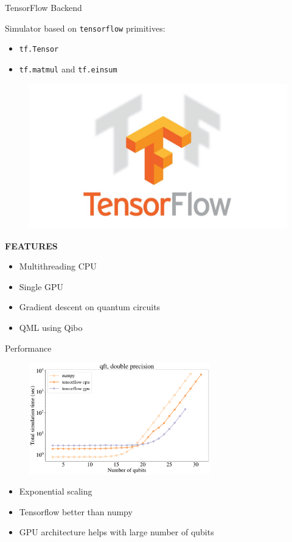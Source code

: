\documentclass[11p,aspectratio=169]{beamer}
\begin{document}
\begin{frame}{TensorFlow Backend}

    \begin{multicols*}{2}
        Simulator based on \texttt{tensorflow} primitives:
    \begin{itemize}
        \item \texttt{tf.Tensor}
        \item  \texttt{tf.matmul} and \texttt{tf.einsum}
    \end{itemize}
    \begin{figure}
        \includegraphics[width=0.3 \textwidth]{figures/tensorflow.jpg}
    \end{figure}
    \end{multicols*}
    

    \textbf{FEATURES}
    \begin{multicols*}{2}
        \begin{itemize}
            \item Multithreading CPU
            \item Single GPU
            \item Gradient descent on quantum circuits
            \item QML using Qibo
        \end{itemize}
    \end{multicols*}
    
\end{frame}

\begin{frame}{Performance}
    \begin{figure}
        \centering
        \includegraphics[width=0.7\textwidth]{figures/np_tf_double.pdf}
    \end{figure}

    \begin{multicols*}{2}
        \begin{itemize}        
        \item Exponential scaling
        \item Tensorflow better than numpy
        \item GPU architecture helps with large number of qubits
    \end{itemize}
    \end{multicols*}

\end{frame}
\end{document}
